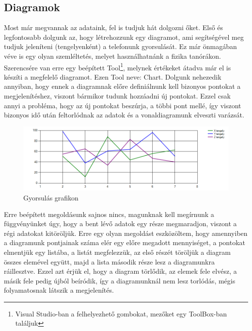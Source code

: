 \documentclass{thesis-ekf}
\theoremstyle{definition}
\theoremstyle{remark}
\begin{document}
\subsection{Diagramok}
Most már megvannak az adataink, fel is tudjuk hát dolgozni őket. Első és legfontosabb dolgunk az, hogy létrehozzunk egy diagramot, ami segítségével meg tudjuk jeleníteni (tengelyenként) a telefonunk gyorsulását. Ez már önmagában véve is egy olyan szemléltetés, melyet használhatnánk a fizika tanórákon. Szerencsére van erre egy beépített Tool\footnote{Visual Studio-ban a felhelyezhető gombokat, mezőket egy ToolBox-ban találjuk}, melynek értékeket átadva már el is készíti a megfelelő diagramot. Ezen Tool neve: Chart. Dolgunk nehezedik annyiban, hogy ennek a diagramnak előre definiálnunk kell bizonyos pontokat a megjelenítéshez, viszont bármikor tudunk hozzáadni új pontokat. Ezzel csak annyi a probléma, hogy az új pontokat beszúrja, a többi pont mellé, így viszont bizonyos idő után feltorlódnak az adatok és a vonaldiagramunk elveszti varázsát. 
\begin{figure}[!h]
	\centering
	\includegraphics[width=15cm]{grafikon}
	\caption{Gyorsulás grafikon}\label{grafikon}
\end{figure}
\par Erre beépített megoldásunk sajnos nincs, magunknak kell megírnunk a függvényünket úgy, hogy a bent lévő adatok egy része megmaradjon, viszont a régi adatokat kitöröljük. Erre egy olyan megoldást eszközöltem, hogy amennyiben a diagramunk pontjainak száma elér egy előre megadott mennyiséget, a pontokat elmentjük egy listába, a listát megfelezzük, az első részét töröljük a diagram összes elemével együtt, majd a lista második része lesz a diagramunkra ráillesztve. Ezzel azt érjük el, hogy a diagram törlődik, az elemek fele elvész, a másik fele pedig újból beíródik, így a diagramunknál nem lesz torlódás, mégis folyamatosnak látszik a megjelenítés.
\end{document}
